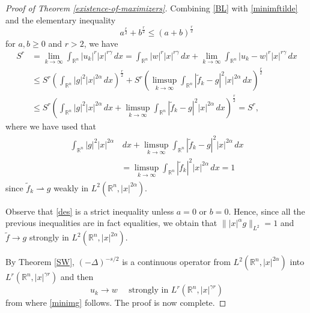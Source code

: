 \documentclass[12pt]{amsart}
\newcommand {\R}{\mathbb{R}}
\begin{document}
\begin{proof}[Proof of Theorem \ref{existence-of-maximizers}]
	
	Combining \eqref{BL} with \eqref{minimftilde} and the elementary inequality 
	\begin{equation} \label{des}
		a^\frac{r}{2}+b^\frac{r}{2} \leq (a+b)^\frac{r}{2}
	\end{equation}
	 for $a,b\geq 0$ and $r>2$, we have
	\begin{align*}
		S^r&=\lim_{k\to\infty} \int_{\R^n} |u_k|^r |x|^{r\gamma}\,dx  =   \int_{\R^n} |w|^r |x|^{r\gamma}\,dx  + \lim_{k\to\infty}  \int_{\R^n} |u_k -w |^r |x|^{r\gamma}\,dx\\
		&\leq S^r\left(  \int_{\R^n} |g|^2 |x|^{2\alpha}\,dx  \right)^\frac{r}{2} + S^r \left( \limsup_{k\to\infty}  \int_{\R^n} |\tilde f_k -g|^2 |x|^{ 2 \alpha } \, dx\right)^\frac{r}{2}\\
		&\leq S^r \left (  \int_{\R^n} |g|^2 |x|^{2 \alpha }\,dx  + \limsup_{k\to\infty}  \int_{\R^n} |\tilde f_k -g|^2 |x|^{2\alpha} \, dx  \right)^\frac{r}{2} =S^r,
	\end{align*}
where we have used that
	\begin{align} \label{ec1}
	\begin{split}
	\int_{\R^n} |g|^2 |x|^{2 \alpha} &\,dx + 
\limsup_{k\to\infty}  \int_{\R^n} |\tilde f_k - g|^2 |x|^{2\alpha } \,dx\\ 
&= \limsup_{k\to\infty} \int_{\R^n} |\tilde f_k|^2 |x|^{2\alpha}  \,dx=1
	\end{split}
	\end{align}
	since $\tilde{f}_{k} \rightharpoonup g$ weakly in $L^2(\R^n, |x|^{ 2\alpha})$.


	Observe that \eqref{des} is a strict inequality unless $a=0$ or $b=0$. Hence, since all the previous inequalities are in fact equalities, we obtain that $\||x|^\alpha g\|_{L^2}=1$ and $\tilde f \to g$ strongly in $L^2(\R^n,|x|^{2\alpha})$.
	
	By Theorem \ref{SW}, $(-\Delta)^{-s/2}$ is a continuous operator from $L^2(\R^n,|x|^{2\alpha})$ into $L^r(\R^n,|x|^{\gamma r})$ and then
	$$
		u_k \to w \quad \mbox{ strongly in } L^r(\R^n, |x|^{\gamma r})
	$$
	from where \eqref{minimg} follows. The proof is now complete.
	

\end{proof}





 
\end{document}
